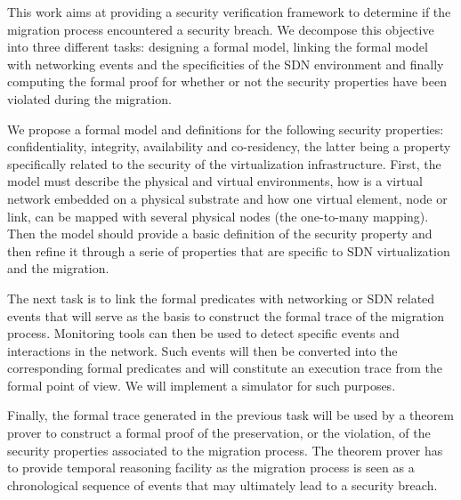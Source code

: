 This work aims at providing a security verification framework to determine if the migration process encountered a security breach.
We decompose this objective into three different tasks: designing a formal model, linking the formal model with networking events and the specificities of the SDN environment and finally computing the formal proof for whether or not the security properties have been violated during the migration.
 
We propose a formal model and definitions for the following security properties: confidentiality, integrity, availability 
and co-residency, the latter being a property specifically related to the security of the virtualization infrastructure. First, the model must describe the physical and virtual environments, how is a virtual network embedded on a physical substrate and how one virtual element, node or link, can be mapped with several physical nodes (\ie the one-to-many mapping).
Then the model should provide a basic definition of the security property and then refine it through a serie of properties that are specific to SDN virtualization and the migration.

The next task is to link the formal predicates with networking or SDN related events that will serve as the basis to construct the formal trace of the migration process.
Monitoring tools can then be used to detect specific events and interactions in the network. Such events will then be converted into the corresponding formal predicates and will constitute an execution trace from the formal point of view.
We will implement a simulator for such purposes.

Finally, the formal trace generated in the previous task will be used by a theorem prover to construct a formal proof of the preservation, or the violation, of the security properties associated to the migration process. The theorem prover has to provide temporal reasoning facility as the migration process is seen as a chronological sequence of events that may ultimately lead to a security breach.




